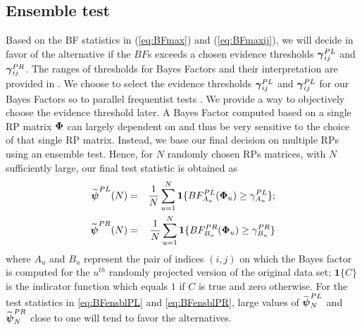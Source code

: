 \documentclass[times,sort&compress,3p]{elsarticle}
\theoremstyle{plain}%
\theoremstyle{definition}
\def\be{\begin{eqnarray}}
\def\ee{\end{eqnarray}}
\def\boldpsi{{\mbox{\boldmath $\psi$}}}
\def\bone{{\mathbf 1}}
\newcommand{\ugamma}            {\mbox{\boldmath$\gamma$}}
\newcommand{\uPhi}              {\mbox{\boldmath$\Phi$}}
\newcommand{\rsz}[1]{\textcolor{red}{#1}}
\begin{document}
\subsection{Ensemble test} \label{sec:testens}
Based on the BF statistics in (\ref{eq:BFmax}) and (\ref{eq:BFmaxij}), we will decide in favor of the alternative if the $BF$s exceeds a chosen evidence thresholds $\ugamma^{PL}_{ij}$ and $\ugamma^{PR}_{ij}$. 
The ranges of thresholds for Bayes Factors and their interpretation are provided in \cite{kass1995bayes}. We choose to select the evidence thresholds $\ugamma^{PL}_{ij}$ and $\ugamma^{PL}_{ij}$ for our Bayes Factors so to parallel frequentist tests \cite{johnson2013uniformly}. We provide a way to objectively choose the evidence threshold later. A Bayes Factor computed based on a single RP matrix $\uPhi$ can largely dependent on and thus be very sensitive to the choice of that single RP matrix. Instead, we base our final decision on multiple RPs using an ensemble test. Hence, for $N$ randomly chosen RPs matrices, with $N$ sufficiently large, our final test statistic is obtained as
{\color{red}
\be
\widetilde{\boldpsi}^{PL}(N) &=& \frac{1}{N}\sum^{N}_{u=1} \bone\{ BF^{PL}_{A_u}(\uPhi_u) \geq \gamma^{PL}_{A_u}\}; \label{eq:BFensblPL}\\
\widetilde{\boldpsi}^{PR}(N) &=& \frac{1}{N}\sum^{N}_{u=1} \bone\{ BF^{PR}_{B_u}(\uPhi_u) \geq \gamma^{PR}_{B_u}\}  \label{eq:BFensblPR}
\ee
}
where $A_u$ and $B_u$ represent the pair of indices $(i,j)$ on which the Bayes factor is computed for the $u^{th}$ randomly projected version of the original data set; $\bone\{C\}$ is the indicator function which equals $1$ if $C$ is true and zero otherwise.
For the test statistics in \eqref{eq:BFensblPL} and \eqref{eq:BFensblPR}, large values of $\widetilde{\boldpsi}^{PL}_{N}$ and $\widetilde{\boldpsi}^{PR}_{N}$ close to one will tend to  favor the alternatives.
\end{document}
